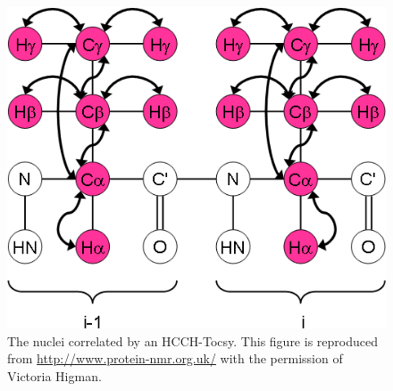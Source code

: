 \begin{figure}
  \includegraphics[scale=0.75]{figures/ccpn_hcchtocsy}
  \caption[The nuclei correlated by an HCCH-Tocsy.]
          {The nuclei correlated by an HCCH-Tocsy.
           This figure is reproduced from \url{http://www.protein-nmr.org.uk/}
           with the permission of Victoria Higman.}
  \label{ccpn_hcchtocsy}
\end{figure}


